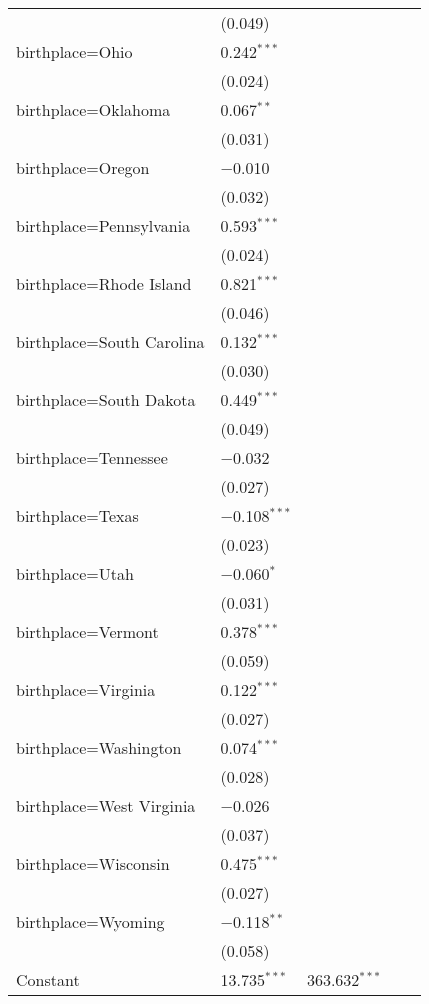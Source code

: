 \begin{longtable}{ll|rrr}
        & (0.049) &  \\ 
        birthplace=Ohio & 0.242$^{***}$ &  \\ 
        & (0.024) &  \\ 
        birthplace=Oklahoma & 0.067$^{**}$ &  \\ 
        & (0.031) &  \\ 
        birthplace=Oregon & $-$0.010 &  \\ 
        & (0.032) &  \\ 
        birthplace=Pennsylvania & 0.593$^{***}$ &  \\ 
        & (0.024) &  \\ 
        birthplace=Rhode Island & 0.821$^{***}$ &  \\ 
        & (0.046) &  \\ 
        birthplace=South Carolina & 0.132$^{***}$ &  \\ 
        & (0.030) &  \\ 
        birthplace=South Dakota & 0.449$^{***}$ &  \\ 
        & (0.049) &  \\ 
        birthplace=Tennessee & $-$0.032 &  \\ 
        & (0.027) &  \\ 
        birthplace=Texas & $-$0.108$^{***}$ &  \\ 
        & (0.023) &  \\ 
        birthplace=Utah & $-$0.060$^{*}$ &  \\ 
        & (0.031) &  \\ 
        birthplace=Vermont & 0.378$^{***}$ &  \\ 
        & (0.059) &  \\ 
        birthplace=Virginia & 0.122$^{***}$ &  \\ 
        & (0.027) &  \\ 
        birthplace=Washington & 0.074$^{***}$ &  \\ 
        & (0.028) &  \\ 
        birthplace=West Virginia & $-$0.026 &  \\ 
        & (0.037) &  \\ 
        birthplace=Wisconsin & 0.475$^{***}$ &  \\ 
        & (0.027) &  \\ 
        birthplace=Wyoming & $-$0.118$^{**}$ &  \\ 
        & (0.058) &  \\ 
        Constant & 13.735$^{***}$ & 363.632$^{***}$ \\ 

\end{longtable}
